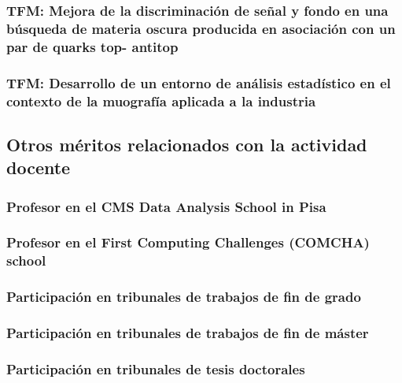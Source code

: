 \documentclass[a4paper, 11pt, twoside, openright]{report}
\begin{document}
\subsubsection{TFM: Mejora de la discriminación de señal y fondo en una búsqueda de materia oscura producida en asociación con un par de quarks top- antitop}


\subsubsection{TFM: Desarrollo de un entorno de análisis estadístico en el contexto de la muografía aplicada a la industria}



\subsection{Otros méritos relacionados con la actividad docente}

\subsubsection{Profesor en el CMS Data Analysis School in Pisa}


\subsubsection{Profesor en el First Computing Challenges (COMCHA) school}


\subsubsection{Participación en tribunales de trabajos de fin de grado}


\subsubsection{Participación en tribunales de trabajos de fin de máster}


\subsubsection{Participación en tribunales de tesis doctorales}

\end{document}
